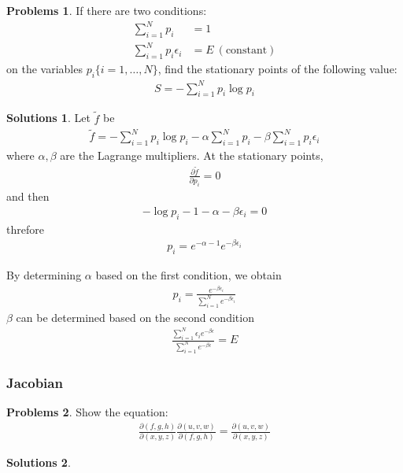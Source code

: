 \documentclass[draft]{article}
\theoremstyle{definition}
\newtheorem{problem}{Problems}[section]
\newtheorem{solution}{Solutions}[section]
\newcommand{\pardif}[2]{\frac{\partial #1}{\partial #2}}
\begin{document}
\begin{problem}
    If there are two conditions:
    \begin{align}
        \sum_{i=1}^Np_i&=1\\
        \sum_{i=1}^Np_i\epsilon_i&=E\ (\mathrm{constant})
    \end{align}
    on the variables $p_i \{i=1,\ldots,N\}$, find the stationary points of the following value:
    \begin{align}
        S=-\sum_{i=1}^Np_i\log p_i
    \end{align}
\end{problem}
\begin{solution}
    Let $\tilde{f}$ be 
    \begin{align}
        \tilde{f} = -\sum_{i=1}^Np_i\log p_i-\alpha\sum_{i=1}^Np_i -\beta\sum_{i=1}^Np_i\epsilon_i
    \end{align}
    where $\alpha, \beta$ are the Lagrange multipliers. At the stationary points,
    \begin{align}
        \pardif{\tilde{f}}{p_i} = 0
    \end{align}
    and then
    \begin{align}
        -\log p_i - 1 - \alpha -\beta\epsilon_i = 0
    \end{align}
    threfore
    \begin{align}
            p_i = e^{-\alpha - 1} e^{-\beta\epsilon_i}
    \end{align}

    By determining $\alpha$ based on the first condition, we obtain
    \begin{align}
        p_i = \frac{e^{-\beta\epsilon_i}}{\sum_{i=1}^Ne^{-\beta\epsilon_i}}
    \end{align}
    $\beta$ can be determined based on the second condition
    \begin{align}
        \frac{\sum_{i=1}^N\epsilon_ie^{-\beta\epsilon}}{\sum_{i=1}^Ne^{-\beta\epsilon}} = E
    \end{align}
\end{solution}   

\subsubsection{Jacobian}

\begin{problem}
    Show the equation:
    \begin{align}
        \pardif{(f,g,h)}{(x,y,z)}\pardif{(u,v,w)}{(f,g,h)} = \pardif{(u,v,w)}{(x,y,z)}
    \end{align}
\end{problem}
\begin{solution}
    
\end{solution}
\end{document}
